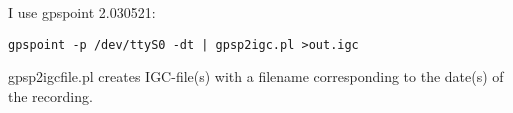 I use gpspoint 2.030521:

\texttt{gpspoint -p /dev/ttyS0 -dt | gpsp2igc.pl >out.igc}

gpsp2igcfile.pl creates IGC-file(s) with a filename corresponding to the date(s) of the recording.










